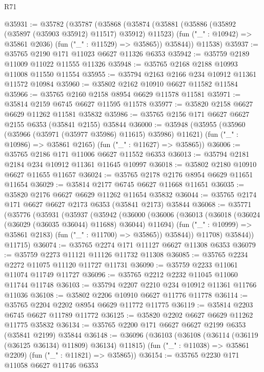 \begin{lexlean}{R71}
\begin{coremodule}
@35931 := @35782
    (@35787
      (@35868
        (@35874
          (@35881
            (@35886 (@35892 (@35897 (@35903 @35912) @11517) @35912) @11523)
            (fun ("_" : @10942) => @35861 @2036)
            (fun ("_" : @11529) => @35865))
          @35844))
      @11538)
@35937 := @35765 @2190 @171 @11023 @6627 @11326 @6353
@35942 := @35759 @2189 @11009 @11022 @11555 @11326
@35948 := @35765 @2168 @2188 @10993 @11008 @11550 @11554
@35955 := @35794 @2163 @2166 @234 @10912 @11361 @11572 @10984
@35960 := @35802 @2162 @10910 @6627 @11582 @11584
@35966 := @35765 @2160 @2158 @8954 @6629 @11578 @11581
@35971 := @35814 @2159 @6745 @6627 @11595 @11578
@35977 := @35820 @2158 @6627 @6629 @11262 @11581 @35832
@35986 := @35765 @2156 @171 @6627 @6627 @2155 @6353 (@35841 @2155) @35844
@36000 := @35948
    (@35955
      (@35960 (@35966 (@35971 (@35977 @35986) @11615) @35986) @11621)
      (fun ("_" : @10986) => @35861 @2165)
      (fun ("_" : @11627) => @35865))
@36006 := @35765 @2186 @171 @11006 @6627 @11552 @6353
@36013 := @35794 @2181 @2184 @234 @10912 @11361 @11645 @10997
@36018 := @35802 @2180 @10910 @6627 @11655 @11657
@36024 := @35765 @2178 @2176 @8954 @6629 @11651 @11654
@36029 := @35814 @2177 @6745 @6627 @11668 @11651
@36035 := @35820 @2176 @6627 @6629 @11262 @11654 @35832
@36044 := @35765 @2174 @171 @6627 @6627 @2173 @6353 (@35841 @2173) @35844
@36068 := @35771
    (@35776
      (@35931
        (@35937
          (@35942
            (@36000
              (@36006
                (@36013
                  (@36018 (@36024 (@36029 (@36035 @36044) @11688) @36044) @11694)
                  (fun ("_" : @10999) => @35861 @2183)
                  (fun ("_" : @11700) => @35865))
                @35844))
            @11708)
          @35844))
      @11715)
@36074 := @35765 @2274 @171 @11127 @6627 @11308 @6353
@36079 := @35759 @2273 @11121 @11126 @11732 @11308
@36085 := @35765 @2234 @2272 @11075 @11120 @11727 @11731
@36090 := @35759 @2233 @11061 @11074 @11749 @11727
@36096 := @35765 @2212 @2232 @11045 @11060 @11744 @11748
@36103 := @35794 @2207 @2210 @234 @10912 @11361 @11766 @11036
@36108 := @35802 @2206 @10910 @6627 @11776 @11778
@36114 := @35765 @2204 @2202 @8954 @6629 @11772 @11775
@36119 := @35814 @2203 @6745 @6627 @11789 @11772
@36125 := @35820 @2202 @6627 @6629 @11262 @11775 @35832
@36134 := @35765 @2200 @171 @6627 @6627 @2199 @6353 (@35841 @2199) @35844
@36148 := @36096
    (@36103
      (@36108 (@36114 (@36119 (@36125 @36134) @11809) @36134) @11815)
      (fun ("_" : @11038) => @35861 @2209)
      (fun ("_" : @11821) => @35865))
@36154 := @35765 @2230 @171 @11058 @6627 @11746 @6353

\end{coremodule}
\end{lexlean}
